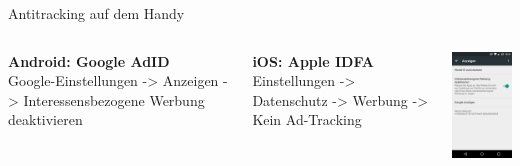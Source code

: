 \begin{frame}{Antitracking auf dem Handy}
  \begin{columns}
    \column{5.5cm}
    \footnotesize

    \textbf{Android: Google AdID}\\
    Google-Einstellungen -> Anzeigen -> Interessensbezogene Werbung deaktivieren\\
    \vspace{0.5cm}

    \textbf{iOS: Apple IDFA}\\
    Einstellungen -> Datenschutz -> Werbung -> Kein Ad-Tracking\\
    \vspace{0.5cm}

    \column{5cm}

    \begin{center}
      \includegraphics[width=3.5cm]{img/google-adid.png}
    \par\end{center}
  \end{columns}
\end{frame}
